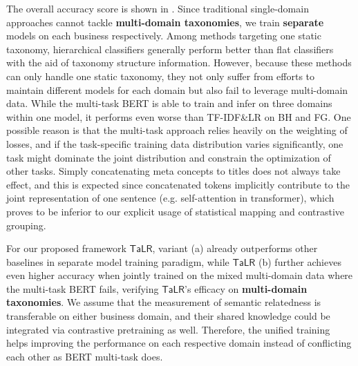 The overall accuracy score is shown in .
Since traditional single-domain approaches cannot tackle \textbf{multi-domain taxonomies}, we train \textbf{separate} models on each business respectively. 
Among methods targeting one static taxonomy, hierarchical classifiers generally perform better than flat classifiers
with the aid of taxonomy structure information.
However, because these methods can only handle one static taxonomy, they not only suffer from efforts to maintain different models for each domain but also fail to leverage multi-domain data. 
While the multi-task BERT is able to train and infer on three domains within one model, it performs even worse than TF-IDF\&LR on BH and FG. 
One possible reason is that the multi-task approach relies heavily on the weighting of losses, and if the task-specific training data distribution varies significantly, one task might dominate the joint distribution and constrain the optimization of other tasks. 
Simply concatenating meta concepts to titles does not always take effect,
and this is expected since concatenated tokens implicitly contribute to the joint representation of one sentence (e.g. self-attention in transformer), which proves to be inferior to our explicit usage of statistical mapping and contrastive grouping.


For our proposed framework $\mathsf{TaLR}$, variant (a) already outperforms other baselines in separate model training paradigm, while $\mathsf{TaLR}$ (b) further achieves even higher accuracy when jointly trained on the mixed multi-domain data where the multi-task BERT fails,
verifying $\mathsf{TaLR}$'s efficacy on \textbf{multi-domain taxonomies}. 
We assume that the measurement of semantic relatedness is transferable on either business domain, and their shared knowledge could be integrated via contrastive pretraining as well. 
Therefore, the unified training helps improving the performance on each respective domain instead of conflicting each other as BERT multi-task does. 

